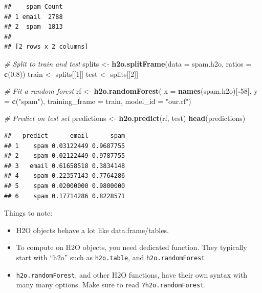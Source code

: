\documentclass[]{book}
\newenvironment{Shaded}{\begin{snugshade}}{\end{snugshade}}
\newcommand{\CommentTok}[1]{\textcolor[rgb]{0.56,0.35,0.01}{\textit{#1}}}
\newcommand{\DataTypeTok}[1]{\textcolor[rgb]{0.13,0.29,0.53}{#1}}
\newcommand{\DecValTok}[1]{\textcolor[rgb]{0.00,0.00,0.81}{#1}}
\newcommand{\FloatTok}[1]{\textcolor[rgb]{0.00,0.00,0.81}{#1}}
\newcommand{\KeywordTok}[1]{\textcolor[rgb]{0.13,0.29,0.53}{\textbf{#1}}}
\newcommand{\NormalTok}[1]{#1}
\newcommand{\OperatorTok}[1]{\textcolor[rgb]{0.81,0.36,0.00}{\textbf{#1}}}
\newcommand{\StringTok}[1]{\textcolor[rgb]{0.31,0.60,0.02}{#1}}
\providecommand{\tightlist}{%
  \setlength{\itemsep}{0pt}\setlength{\parskip}{0pt}}
\theoremstyle{definition}
\theoremstyle{definition}
\theoremstyle{definition}
\theoremstyle{remark}
\begin{document}
\begin{Shaded}
\end{Shaded}

\begin{verbatim}
##    spam Count
## 1 email  2788
## 2  spam  1813
## 
## [2 rows x 2 columns]
\end{verbatim}

\begin{Shaded}
\begin{Highlighting}[]
\CommentTok{# Split to train and test}
\NormalTok{splits <-}\StringTok{ }\KeywordTok{h2o.splitFrame}\NormalTok{(}\DataTypeTok{data =}\NormalTok{ spam.h2o, }\DataTypeTok{ratios =} \KeywordTok{c}\NormalTok{(}\FloatTok{0.8}\NormalTok{))}
\NormalTok{train <-}\StringTok{ }\NormalTok{splits[[}\DecValTok{1}\NormalTok{]]}
\NormalTok{test <-}\StringTok{ }\NormalTok{splits[[}\DecValTok{2}\NormalTok{]]}

\CommentTok{# Fit a random forest}
\NormalTok{rf <-}\StringTok{ }\KeywordTok{h2o.randomForest}\NormalTok{(}
  \DataTypeTok{x =} \KeywordTok{names}\NormalTok{(spam.h2o)[}\OperatorTok{-}\DecValTok{58}\NormalTok{],}
  \DataTypeTok{y =} \KeywordTok{c}\NormalTok{(}\StringTok{"spam"}\NormalTok{),}
  \DataTypeTok{training_frame =}\NormalTok{ train,}
  \DataTypeTok{model_id =} \StringTok{"our.rf"}\NormalTok{)}

\CommentTok{# Predict on test set}
\NormalTok{predictions <-}\StringTok{ }\KeywordTok{h2o.predict}\NormalTok{(rf, test)}
\KeywordTok{head}\NormalTok{(predictions)}
\end{Highlighting}
\end{Shaded}

\begin{verbatim}
##   predict      email      spam
## 1    spam 0.03122449 0.9687755
## 2    spam 0.02122449 0.9787755
## 3   email 0.61658518 0.3834148
## 4    spam 0.22357143 0.7764286
## 5    spam 0.02000000 0.9800000
## 6    spam 0.17714286 0.8228571
\end{verbatim}

Things to note:

\begin{itemize}
\tightlist
\item
  H2O objects behave a lot like data.frame/tables.
\item
  To compute on H2O objects, you need dedicated function. They typically start with ``h2o'' such as \texttt{h2o.table}, and \texttt{h2o.randomForest}.
\item
  \texttt{h2o.randomForest}, and other H2O functions, have their own syntax with many many options. Make sure to read \texttt{?h2o.randomForest}.
\end{itemize}
\end{document}

